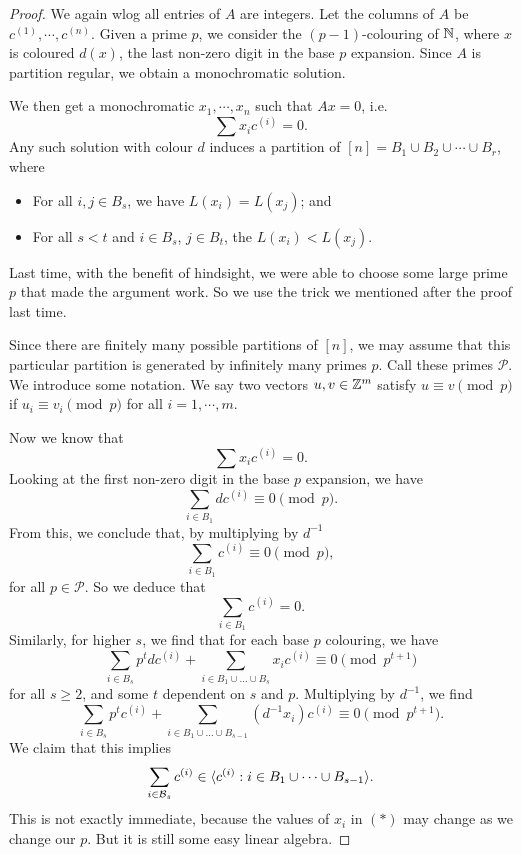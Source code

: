 \documentclass[a4paper]{article}
\begin{document}
\begin{proof}
  We again wlog all entries of $A$ are integers. Let the columns of $A$ be $c^{(1)}, \cdots, c^{(n)}$. Given a prime $p$, we consider the $(p - 1)$-colouring of $\mathbb{N}$, where $x$ is coloured $d(x)$, the last non-zero digit in the base $p$ expansion. Since $A$ is partition regular, we obtain a monochromatic solution.

  We then get a monochromatic $x_1, \cdots, x_n$ such that $Ax = 0$, i.e.
  \[
    \sum x_i c^{(i)} = 0.
  \]
  Any such solution with colour $d$ induces a partition of $[n] = B_1 \cup B_2 \cup \cdots \cup B_r$, where
  \begin{itemize}
    \item For all $i, j \in B_s$, we have $L(x_i) = L(x_j)$; and
    \item For all $s < t$ and $i \in B_s$, $j \in B_t$, the $L(x_i) < L(x_j)$.
  \end{itemize}
  Last time, with the benefit of hindsight, we were able to choose some large prime $p$ that made the argument work. So we use the trick we mentioned after the proof last time.

  Since there are finitely many possible partitions of $[n]$, we may assume that this particular partition is generated by infinitely many primes $p$. Call these primes $\mathcal{P}$. We introduce some notation. We say two vectors $u, v \in \mathbb{Z}^m$ satisfy $u \equiv v \pmod p$ if $u_i \equiv v_i \pmod p$ for all $i = 1, \cdots, m$.

  Now we know that
  \[
    \sum x_i c^{(i)} = 0.
  \]
  Looking at the first non-zero digit in the base $p$ expansion, we have
  \[
    \sum_{i \in B_1} d c^{(i)} \equiv 0 \pmod p.
  \]
  From this, we conclude that, by multiplying by $d^{-1}$
  \[
    \sum_{i \in B_1} c^{(i)} \equiv 0 \pmod p,
  \]
  for all $p \in \mathcal{P}$. So we deduce that
  \[
    \sum_{i \in B_1} c^{(i)} = 0.
  \]
  Similarly, for higher $s$, we find that for each base $p$ colouring, we have
  \[
    \sum_{i \in B_s} p^t d c^{(i)} + \sum_{i \in B_1 \cup \ldots \cup B_s} x_i c^{(i)} \equiv 0 \pmod {p^{t + 1}}
  \]
  for all $s \geq 2$, and some $t$ dependent on $s$ and $p$. Multiplying by $d^{-1}$, we find
  \[
    \sum_{i \in B_s} p^t c^{(i)} + \sum_{i \in B_1 \cup \ldots \cup B_{s - 1}} (d^{-1} x_i) c^{(i)} \equiv 0 \pmod {p^{t + 1}}.\tag{$*$}
  \]
  We claim that this implies
  \[
    \sum_{i \in \mathcal{B}_s} c^{(i)} \in \langle c^{(i)}: i \in B_1 \cup \cdots \cup B_{s - 1}\rangle.
  \]
  This is not exactly immediate, because the values of $x_i$ in $(*)$ may change as we change our $p$. But it is still some easy linear algebra.


\end{proof}
\end{document}
